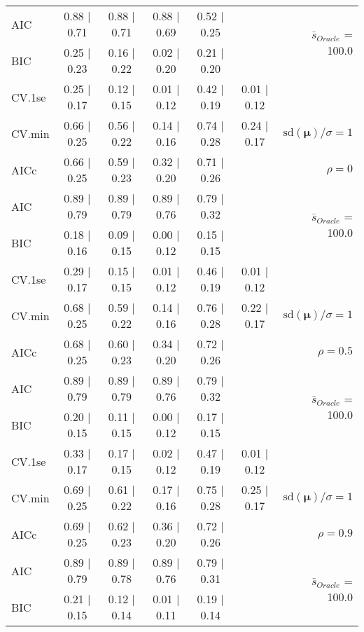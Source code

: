 \begin{table}
\begin{center}
\begin{tabular}{l*{5}{c}|r}
AIC & 0.88 $\mid$ 0.71 & 0.88 $\mid$ 0.71 & 0.88 $\mid$ 0.69 & 0.52 $\mid$ 0.25 & &  \multirow{2}{*}{$\bar{s}_{Oracle}$ = 100.0} \\
BIC & 0.25 $\mid$ 0.23 & 0.16 $\mid$ 0.22 & 0.02 $\mid$ 0.20 & 0.21 $\mid$ 0.20 & &  \\
 \hline 
CV.1se & 0.25 $\mid$ 0.17 & 0.12 $\mid$ 0.15 & 0.01 $\mid$ 0.12 & 0.42 $\mid$ 0.19 & 0.01 $\mid$ 0.12 & \\
CV.min & 0.66 $\mid$ 0.25 & 0.56 $\mid$ 0.22 & 0.14 $\mid$ 0.16 & 0.74 $\mid$ 0.28 & 0.24 $\mid$ 0.17 &  $\mathrm{sd}(\mathbf{\mu})/\sigma=1$ \\
AICc & 0.66 $\mid$ 0.25 & 0.59 $\mid$ 0.23 & 0.32 $\mid$ 0.20 & 0.71 $\mid$ 0.26 & & $\rho=0$ \\
AIC & 0.89 $\mid$ 0.79 & 0.89 $\mid$ 0.79 & 0.89 $\mid$ 0.76 & 0.79 $\mid$ 0.32 & &  \multirow{2}{*}{$\bar{s}_{Oracle}$ = 100.0} \\
BIC & 0.18 $\mid$ 0.16 & 0.09 $\mid$ 0.15 & 0.00 $\mid$ 0.12 & 0.15 $\mid$ 0.15 & &  \\
 \hline 
CV.1se & 0.29 $\mid$ 0.17 & 0.15 $\mid$ 0.15 & 0.01 $\mid$ 0.12 & 0.46 $\mid$ 0.19 & 0.01 $\mid$ 0.12 & \\
CV.min & 0.68 $\mid$ 0.25 & 0.59 $\mid$ 0.22 & 0.14 $\mid$ 0.16 & 0.76 $\mid$ 0.28 & 0.22 $\mid$ 0.17 &  $\mathrm{sd}(\mathbf{\mu})/\sigma=1$ \\
AICc & 0.68 $\mid$ 0.25 & 0.60 $\mid$ 0.23 & 0.34 $\mid$ 0.20 & 0.72 $\mid$ 0.26 & & $\rho=0.5$ \\
AIC & 0.89 $\mid$ 0.79 & 0.89 $\mid$ 0.79 & 0.89 $\mid$ 0.76 & 0.79 $\mid$ 0.32 & &  \multirow{2}{*}{$\bar{s}_{Oracle}$ = 100.0} \\
BIC & 0.20 $\mid$ 0.15 & 0.11 $\mid$ 0.15 & 0.00 $\mid$ 0.12 & 0.17 $\mid$ 0.15 & &  \\
 \hline 
CV.1se & 0.33 $\mid$ 0.17 & 0.17 $\mid$ 0.15 & 0.02 $\mid$ 0.12 & 0.47 $\mid$ 0.19 & 0.01 $\mid$ 0.12 & \\
CV.min & 0.69 $\mid$ 0.25 & 0.61 $\mid$ 0.22 & 0.17 $\mid$ 0.16 & 0.75 $\mid$ 0.28 & 0.25 $\mid$ 0.17 &  $\mathrm{sd}(\mathbf{\mu})/\sigma=1$ \\
AICc & 0.69 $\mid$ 0.25 & 0.62 $\mid$ 0.23 & 0.36 $\mid$ 0.20 & 0.72 $\mid$ 0.26 & & $\rho=0.9$ \\
AIC & 0.89 $\mid$ 0.79 & 0.89 $\mid$ 0.78 & 0.89 $\mid$ 0.76 & 0.79 $\mid$ 0.31 & &  \multirow{2}{*}{$\bar{s}_{Oracle}$ = 100.0} \\
BIC & 0.21 $\mid$ 0.15 & 0.12 $\mid$ 0.14 & 0.01 $\mid$ 0.11 & 0.19 $\mid$ 0.14 & &  \\

\end{tabular}
\end{center}
\end{table}
